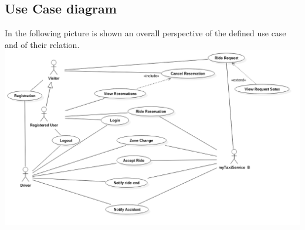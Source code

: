 \documentclass[11pt]{article} %
\begin{document}
        
        
  \subsection {Use Case diagram}
  In the following picture is shown an overall perspective of the defined use case and of their relation.
\includegraphics[scale=0.4]{usecase.png}
\end{document}

